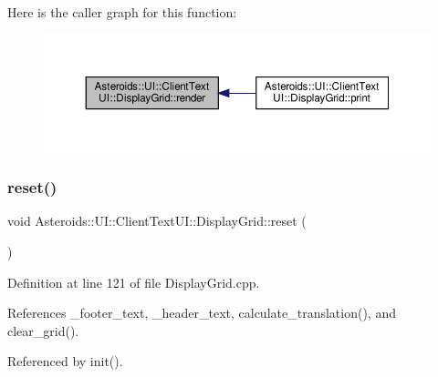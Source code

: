 Here is the caller graph for this function\+:\nopagebreak
\begin{figure}[H]
\begin{center}
\leavevmode
\includegraphics[width=350pt]{classAsteroids_1_1UI_1_1ClientTextUI_1_1DisplayGrid_a72317ad63490f1041543c51b21da527e_icgraph}
\end{center}
\end{figure}
\mbox{\label{classAsteroids_1_1UI_1_1ClientTextUI_1_1DisplayGrid_a118e0cad34b68aae5b178bd8e2b344c5}} 
\subsubsection{\texorpdfstring{reset()}{reset()}}
{\footnotesize\ttfamily void Asteroids\+::\+U\+I\+::\+Client\+Text\+U\+I\+::\+Display\+Grid\+::reset (\begin{DoxyParamCaption}{ }\end{DoxyParamCaption})}



Definition at line 121 of file Display\+Grid.\+cpp.



References \+\_\+footer\+\_\+text, \+\_\+header\+\_\+text, calculate\+\_\+translation(), and clear\+\_\+grid().



Referenced by init().

